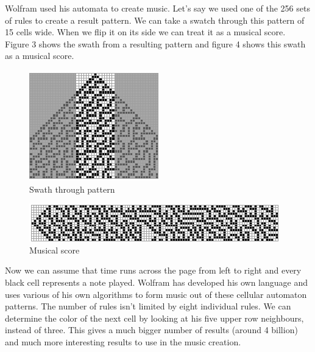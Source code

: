 \documentclass[12pt]{article}
\begin{document}
Wolfram used his automata to create music. Let's say we used one of the 256 sets of rules to create a result pattern. We can take a swatch through this pattern of 15 cells wide. When we flip it on its side we can treat it as a musical score.
Figure 3 shows the swath from a resulting pattern and figure 4 shows this swath as a musical score.

 \begin{figure}[h]
\centering
\includegraphics[]{img/wolframMusic1}
\caption{Swath through pattern}
\end{figure}

\begin{figure}[h]
\centering
\includegraphics[]{img/wolframMusic2}
\caption{Musical score}
\end{figure}

Now we can assume that time runs across the page from left to right and every black cell represents a note played. Wolfram has developed his own language and uses various of his own algorithms to form music out of these cellular automaton patterns.
\newline
\newline
The number of rules isn't limited by eight individual rules. We can determine the color of the next cell by looking at his five upper row neighbours, instead of three. This gives a much bigger number of results (around 4 billion) and much more interesting results to use in the music creation. 
\end{document}
